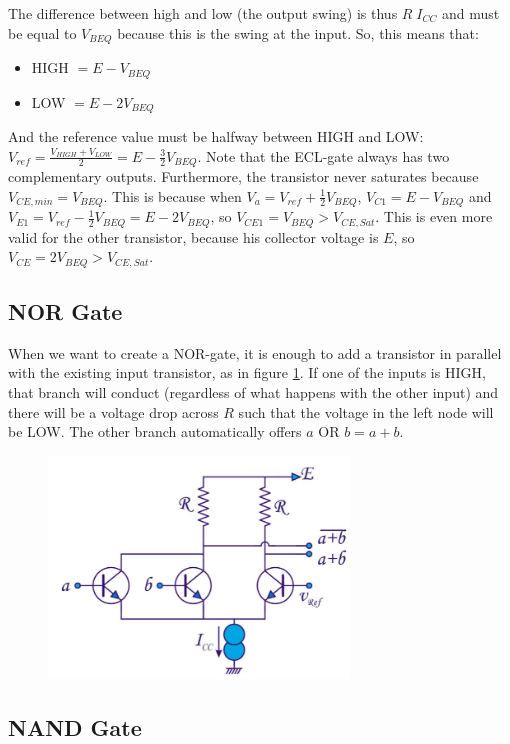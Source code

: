 The difference between high and low (the output swing) is thus $R\;I_{CC}$ and must be equal to $V_{BEQ}$ because this is the swing at the input. So, this means that:
\begin{itemize}
	\item HIGH $= E - V_{BEQ}$
	\item LOW $= E -  2 V_{BEQ}$
\end{itemize}
And the reference value must be halfway between HIGH and LOW: $V_{ref} = \frac{V_{HIGH} + V_{LOW}}{2} = E - \frac{3}{2} V_{BEQ}$. Note that the ECL-gate always has two complementary outputs. Furthermore, the transistor never saturates because $V_{CE, min} = V_{BEQ}$. This is because when $V_a = V_{ref} + \frac{1}{2} V_{BEQ}$, $V_{C1} = E-V_{BEQ}$ and $V_{E1} =  V_{ref} - \frac{1}{2} V_{BEQ} = E - 2V_{BEQ}$, so $V_{CE1} = V_{BEQ} > V_{CE, Sat}$. This is even more valid for the other transistor, because his collector voltage is $E$, so $V_{CE} = 2V_{BEQ} > V_{CE, Sat}$. \\

\subsection{NOR Gate}

When we want to create a NOR-gate, it is enough to add a transistor in parallel with the existing input transistor, as in figure \ref{fig:ecl2}. If one of the inputs is HIGH, that branch will conduct (regardless of what happens with the other input) and there will be a voltage drop across $R$ such that the voltage in the left node will be LOW. The other branch automatically offers $a \text{ OR } b = a + b$.

\begin{figure}[h!]
	\centering
	\includegraphics[width=8cm]{figures/ch15/ecl2.jpg}
	\caption{}
	\label{fig:ecl2}
\end{figure}

\subsection{NAND Gate}

